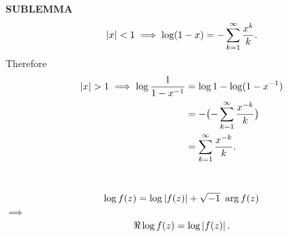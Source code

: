 \vspace{0.1cm}

\begin{x}{\small\bf SUBLEMMA} \ %
\[
\left\vert x\right\vert < 1 \implies \log (1 - x) = -\sum_{k = 1}^\infty \frac{x^{k}}{k}.
\]
Therefore
\begin{align*}
\left\vert x\right\vert > 1 \implies  \log \frac{1}{1 - x^{-1}}
&=  \log 1 - \log (1 - x^{-1})\\
&=  -\bigl( -\sum_{k = 1}^\infty \frac{x^{-k}}{k}\bigr)\\
&=  \sum_{k = 1}^\infty \frac{x^{-k}}{k}.
\end{align*}
\end{x}

\vspace{0.1cm}


\begin{x}{\small\bf {}} \ %
\[
\log f(z) = \log \left\vert f(z)\right\vert + \sqrt{-1} \  \arg f(z) 
\]
\qquad \qquad\qquad \qquad$\implies$
\[
\Re \log f(z) = \log \left\vert f(z)\right\vert.
\]
\end{x}

\vspace{0.1cm}


